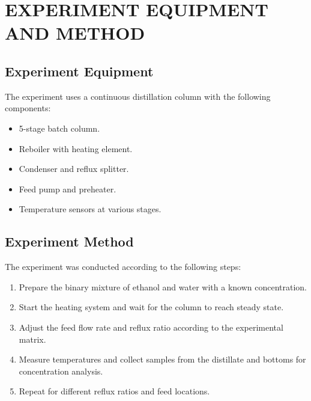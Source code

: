 \section{EXPERIMENT EQUIPMENT AND METHOD}

\subsection{Experiment Equipment}

The experiment uses a continuous distillation column with the following components:
\begin{itemize}
    \item 5-stage batch column.
    \item Reboiler with heating element.
    \item Condenser and reflux splitter.
    \item Feed pump and preheater.
    \item Temperature sensors at various stages.
\end{itemize}

\subsection{Experiment Method}

The experiment was conducted according to the following steps:
\begin{enumerate}
    \item Prepare the binary mixture of ethanol and water with a known concentration.
    \item Start the heating system and wait for the column to reach steady state.
    \item Adjust the feed flow rate and reflux ratio according to the experimental matrix.
    \item Measure temperatures and collect samples from the distillate and bottoms for concentration analysis.
    \item Repeat for different reflux ratios and feed locations.
\end{enumerate}
